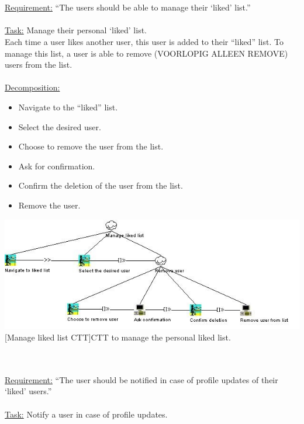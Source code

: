 \documentclass[11pt, a4paper,svglistings,oneside]{book}
\begin{document}
$\;$ \\ \\
\underline{Requirement:} ``The users should be able to manage their `liked' list.'' \\ \\
\underline{Task:} Manage their personal `liked' list. \\
Each time a user likes another user, this user is added to their ``liked'' list. To manage this list, a user is able to remove (VOORLOPIG ALLEEN REMOVE) users from the list. \\ \\
\underline{Decomposition:}
\begin{itemize}
\item Navigate to the ``liked'' list.
\item Select the desired user.
\item Choose to remove the user from the list.
\item Ask for confirmation.
\item Confirm the deletion of the user from the list.
\item Remove the user.
\end{itemize}
\noindent\begin{minipage}{\textwidth}
    \centering
   \includegraphics[width=\textwidth]{CTT_LikeList.png}
 [Manage liked list CTT]{CTT to manage the personal liked list.}
\end{minipage}
$\;$ \\ \\
\underline{Requirement:} ``The user should be notified in case of profile updates of their `liked' users.'' \\ \\
\underline{Task:} Notify a user in case of profile updates. \\
\end{document}
